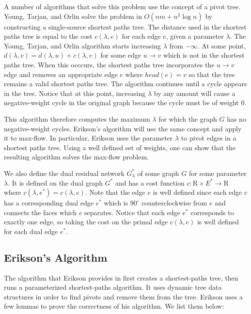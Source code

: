 \documentclass[12pt]{article}
\begin{document}
A number of algorithms that solve this problem use the concept of a pivot tree. Young, Tarjan, and Orlin \cite{youngtarjanorlin1991} solve the problem in $O(nm + n^2 \log n)$ by constructing a single-source shortest paths tree. The distance used in the shortest paths tree is equal to the cost $c(\lambda, e)$ for each edge $e$, given a parameter $\lambda$. The Young, Tarjan, and Orlin algorithm starts increasing $\lambda$ from $-\infty$. At some point, $d(\lambda, v) = d(\lambda, u) + c(\lambda, v)$ for some edge $u \to v$ which is not in the shortest paths tree. When this occcurs, the shortest paths tree incorporates the $u \to v$ edge and removes an appropriate edge $e$ where $head(e) = v$ so that the tree remains a valid shortest paths tree. The algorithm continues until a cycle appears in the tree. Notice that at this point, increasing $\lambda$ by any amount will cause a negative-weight cycle in the original graph because the cycle must be of weight 0. 

This algorithm therefore computes the maximum $\lambda$ for which the graph $G$ has no negative-weight cycles. Erikson's algorithm will use the same concept and apply it to max-flow. In particular, Erikson uses the parameter $\lambda$ to pivot edges in a shortest paths tree. Using a well defined set of weights, one can show that the resulting algorithm solves the max-flow problem.

We also define the dual residual network $G^*_\lambda$ of some graph $G$ for some parameter $\lambda$. It is defined on the dual graph $G^*$ and has a cost function $c : \mathrm{R} \times E^* \to \mathrm{R}$ where $c(\lambda, e^*) = c(\lambda, e)$. Note that the edge $e$ is well defined since each edge $e$ has a corresponding dual edge $e^*$ which is $90^\circ$ counterclockwise from $e$ and connects the faces which $e$ separates. Notice that each edge $e^*$ corresponds to exactly one edge, so taking the cost on the primal edge $c(\lambda, e)$ is well defined for each dual edge $e^*$. 

\subsection{Erikson's Algorithm}

The algorithm that Erikson provides in \cite{erikson2010} first creates a shortest-paths tree, then runs a parameterized shortest-paths algorithm. It uses dynamic tree data structures in order to find pivots and remove them from the tree. Erikson uses a few lemmas to prove the correctness of his algorithm. We list them below:
\end{document}
